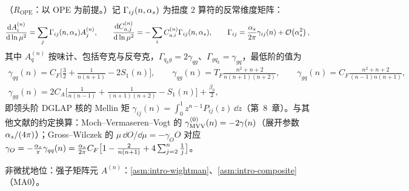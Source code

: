 \begin{proposition}\label{prop:dis-ope-rg}
（$R_{\mathrm{OPE}}$：以 OPE 为前提。）记 $\Gamma_{ij}(n,\alpha_s)$ 为扭度 2 算符的反常维度矩阵：
\begin{equation}\label{eq:dis-rg}
\frac{\mathrm{d} A^{(n)}_i}{\mathrm{d}\ln\mu^2}=\sum_j\Gamma_{ij}(n,\alpha_s)A^{(n)}_j,\qquad \frac{\mathrm{d} C^{(n)}_{a,j}}{\mathrm{d}\ln\mu^2}=-\sum_iC^{(n)}_{a,i}\Gamma_{ij}(n,\alpha_s),\qquad \Gamma_{ij}=\frac{\alpha_s}{2\pi}\gamma_{ij}(n)+\mathcal{O}\!\left(\alpha_s^2\right),
\end{equation}
其中 $A^{(n)}_q$ 按味计、包括夸克与反夸克，$\Gamma_{q_kg}=2\gamma_{qg}$、$\Gamma_{gq_k}=\gamma_{gq}$，最低阶的值为%
\begin{gather}
\gamma_{qq}(n)=C_F\Big[\frac32+\frac1{n(n+1)}-2S_1(n)\Big],\qquad \gamma_{qg}(n)=T_F\frac{n^2+n+2}{n(n+1)(n+2)},\qquad \gamma_{gq}(n)=C_F\frac{n^2+n+2}{(n-1)n(n+1)},\nonumber\\
\gamma_{gg}(n)=2C_A\Big[\frac1{n(n-1)}+\frac1{(n+1)(n+2)}-S_1(n)\Big]+\frac{\beta_0}2,\label{eq:dis-gamma0}
\end{gather}
即领头阶 DGLAP 核的 Mellin 矩 $\gamma_{ij}(n)=\int_0^1z^{n-1}P_{ij}(z)\,\dd z$（第~8~章）。与其他文献的约定换算：Moch--Vermaseren--Vogt 的 $\gamma^{(0)}_{\rm MVV}(n)=-2\gamma(n)$（展开参数 $\alpha_s/(4\pi)$）；Gross--Wilczek 的 $\mu\,\dd O/\dd\mu=-\gamma_OO$ 对应 $\gamma_O=-\frac{\alpha_s}\pi\gamma_{qq}(n)=\frac{\alpha_s}{2\pi}C_F\big[1-\frac2{n(n+1)}+4\sum_{j=2}^n\frac1j\big]$。
\par
非微扰地位：强子矩阵元 $A^{(n)}$：\cref{asm:intro-wightman}、\cref{asm:intro-composite}（MA0）。
\end{proposition}


